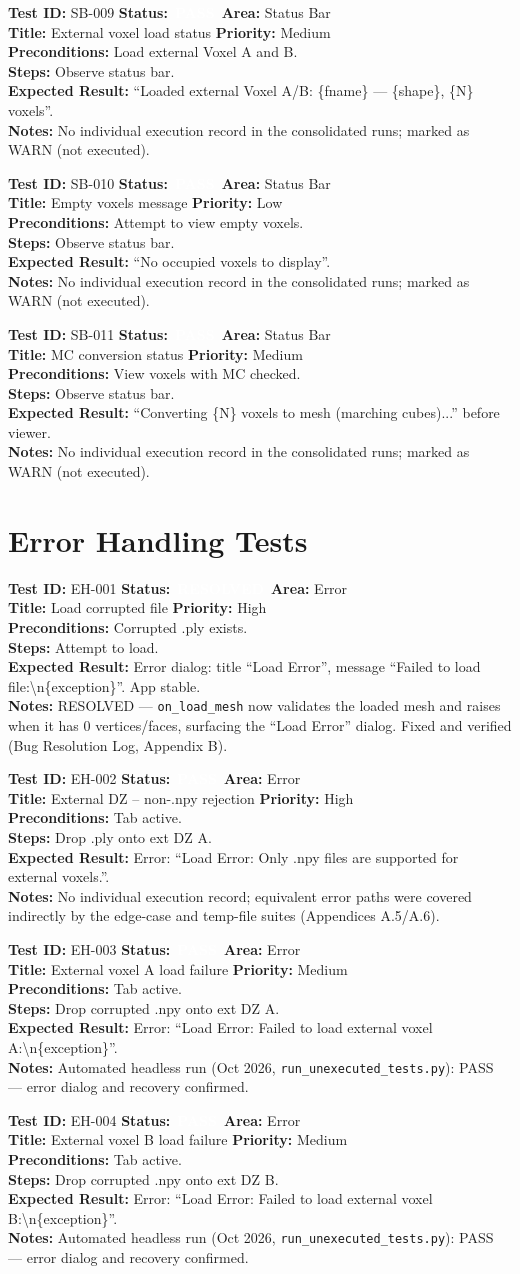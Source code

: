 \documentclass[12pt,a4paper]{article}
\newcommand{\statuspass}{\colorbox{statusgreen}{\textcolor{white}{\textbf{\,PASS\,}}}}
\newcommand{\statusresolved}{\colorbox{statusorange}{\textcolor{white}{\textbf{\,RESOLVED\,}}}}
\newcommand{\testcase}[9]{%
  \smallskip
  \noindent\textbf{Test ID:} #1 \hfill \textbf{Status:} #2 \hfill \textbf{Area:} #3 \\
  \textbf{Title:} #4 \hfill \textbf{Priority:} #5 \\[0.3em]
  \textbf{Preconditions:} #6 \\[0.3em]
  \textbf{Steps:} #7 \\[0.3em]
  \textbf{Expected Result:} #8 \\
  \textbf{Notes:} #9
  \smallskip
}
\begin{document}
\testcase{SB-009}{\statuspass}{Status Bar}{External voxel load status}{Medium}{Load external Voxel A and B.}{Observe status bar.}{``Loaded external Voxel A/B: \{fname\} --- \{shape\}, \{N\} voxels''.}{No individual execution record in the consolidated runs; marked as WARN (not executed).}


\testcase{SB-010}{\statuspass}{Status Bar}{Empty voxels message}{Low}{Attempt to view empty voxels.}{Observe status bar.}{``No occupied voxels to display''.}{No individual execution record in the consolidated runs; marked as WARN (not executed).}


\testcase{SB-011}{\statuspass}{Status Bar}{MC conversion status}{Medium}{View voxels with MC checked.}{Observe status bar.}{``Converting \{N\} voxels to mesh (marching cubes)...'' before viewer.}{No individual execution record in the consolidated runs; marked as WARN (not executed).}



\section{Error Handling Tests}

\testcase{EH-001}{\statusresolved}{Error}{Load corrupted file}{High}{Corrupted .ply exists.}{Attempt to load.}{Error dialog: title ``Load Error'', message ``Failed to load file:\textbackslash n\{exception\}''. App stable.}{RESOLVED --- \texttt{on\_load\_mesh} now validates the loaded mesh and raises when it has 0 vertices/faces, surfacing the ``Load Error'' dialog. Fixed and verified (Bug Resolution Log, Appendix B).}


\testcase{EH-002}{\statuspass}{Error}{External DZ -- non-.npy rejection}{High}{Tab active.}{Drop .ply onto ext DZ A.}{Error: ``Load Error: Only .npy files are supported for external voxels.''.}{No individual execution record; equivalent error paths were covered indirectly by the edge-case and temp-file suites (Appendices A.5/A.6).}


\testcase{EH-003}{\statuspass}{Error}{External voxel A load failure}{Medium}{Tab active.}{Drop corrupted .npy onto ext DZ A.}{Error: ``Load Error: Failed to load external voxel A:\textbackslash n\{exception\}''.}{Automated headless run (Oct 2026, \texttt{run\_unexecuted\_tests.py}): PASS --- error dialog and recovery confirmed.}


\testcase{EH-004}{\statuspass}{Error}{External voxel B load failure}{Medium}{Tab active.}{Drop corrupted .npy onto ext DZ B.}{Error: ``Load Error: Failed to load external voxel B:\textbackslash n\{exception\}''.}{Automated headless run (Oct 2026, \texttt{run\_unexecuted\_tests.py}): PASS --- error dialog and recovery confirmed.}
\end{document}
